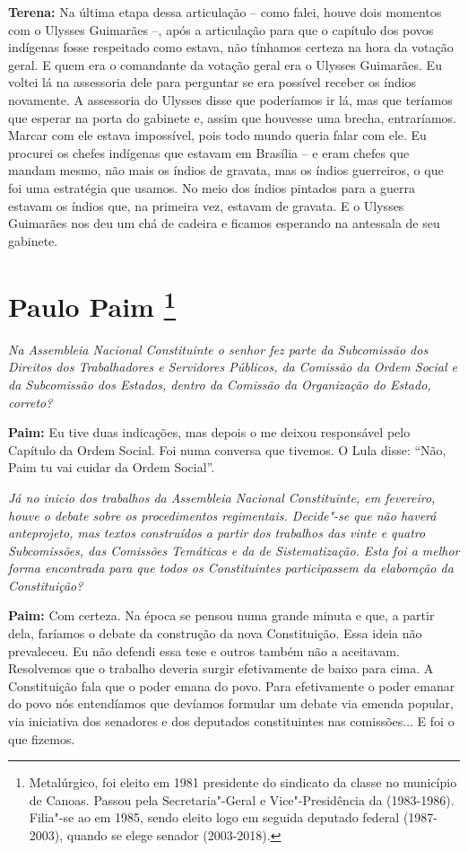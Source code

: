 \textbf{Terena:} Na última etapa dessa articulação -- como falei, houve
dois momentos com o Ulysses Guimarães --, após a articulação para que o
capítulo dos povos indígenas fosse respeitado como estava, não tínhamos
certeza na hora da votação geral. E quem era o comandante da votação
geral era o Ulysses Guimarães. Eu voltei lá na assessoria dele para
perguntar se era possível receber os índios novamente. A assessoria do
Ulysses disse que poderíamos ir lá, mas que teríamos que esperar na
porta do gabinete e, assim que houvesse uma brecha, entraríamos. Marcar
com ele estava impossível, pois todo mundo queria falar com ele. Eu
procurei os chefes indígenas que estavam em Brasília -- e eram chefes
que mandam mesmo, não mais os índios de gravata, mas os índios
guerreiros, o que foi uma estratégia que usamos. No meio dos índios
pintados para a guerra estavam os índios que, na primeira vez, estavam
de gravata. E o Ulysses Guimarães nos deu um chá de cadeira e ficamos
esperando na antessala de seu gabinete.

\chapter{Paulo Paim
\footnote{Metalúrgico, foi eleito em 1981 presidente do sindicato da classe no
município de Canoas. Passou pela Secretaria"-Geral e Vice"-Presidência da
 (1983-1986). Filia"-se ao  em 1985, sendo eleito logo em seguida
deputado federal (1987-2003), quando se elege senador (2003-2018).}}

\emph{Na Assembleia Nacional Constituinte o senhor fez parte da
Subcomissão dos Direitos dos Trabalhadores e Servidores Públicos, da
Comissão da Ordem Social e da Subcomissão dos Estados, dentro da
Comissão da Organização do Estado, correto?}

\textbf{Paim:} Eu tive duas indicações, mas depois o  me deixou
responsável pelo Capítulo da Ordem Social. Foi numa conversa que
tivemos. O Lula disse: ``Não, Paim tu vai cuidar da Ordem Social''.

\emph{Já no inicio dos trabalhos da Assembleia Nacional Constituinte,
em fevereiro, houve o debate sobre os procedimentos regimentais.
Decide"-se que não haverá anteprojeto, mas textos construídos a partir
dos trabalhos das vinte e quatro Subcomissões, das Comissões Temáticas e
da de Sistematização. Esta foi a melhor forma encontrada para que todos
os Constituintes participassem da elaboração da Constituição?}

\textbf{Paim:} Com certeza. Na época se pensou numa grande minuta e que,
a partir dela, faríamos o debate da construção da nova Constituição.
Essa ideia não prevaleceu. Eu não defendi essa tese e outros também não
a aceitavam. Resolvemos que o trabalho deveria surgir efetivamente de
baixo para cima. A Constituição fala que o poder emana do povo. Para
efetivamente o poder emanar do povo nós entendíamos que devíamos
formular um debate via emenda popular, via iniciativa dos senadores e
dos deputados constituintes nas comissões... E foi o que fizemos.

